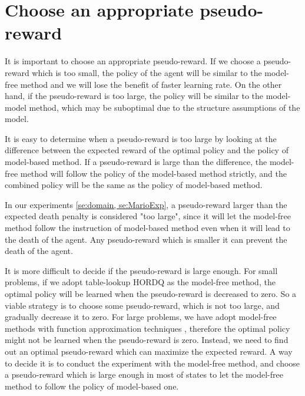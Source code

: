 


\section{Choose an appropriate pseudo-reward}
It is important to choose an appropriate pseudo-reward. If we choose a pseudo-reward which is too small, 
the policy of the agent will be similar to the model-free method and we will lose the 
benefit of faster learning rate. On the other hand, if the pseudo-reward is too large, 
the policy will be similar to the model-model method, which may be suboptimal due
to the structure assumptions of the model.

It is easy to determine when a pseudo-reward is too large by
looking at the difference between the expected reward of the optimal policy and the policy of model-based method.
If a pseudo-reward is large than the difference, the model-free method will follow the policy
of the model-based method strictly, and the combined policy will be the same as 
the policy of model-based method.

In our experiments \ref{se:domain, se:MarioExp}, a pseudo-reward larger than the expected death penalty is considered "too large", 
since it will let the model-free method follow the instruction of model-based method even 
when it will lead to the death of the agent. Any pseudo-reward which is smaller it can prevent the
death of the agent.

It is more difficult to decide if the pseudo-reward is large enough. 
For small problems, if we adopt table-lookup HORDQ as the model-free method,
the optimal policy will be learned when the pseudo-reward is decreased to zero.
So a viable strategy is to choose some pseudo-reward, which is not too large, and
gradually decrease it to zero.
For large problems, we have adopt model-free methods with function approximation techniques
, therefore the optimal policy might not be learned when the pseudo-reward is zero.
Instead, we need to find out an optimal pseudo-reward which can maximize the expected reward.
A way to decide it is to conduct the experiment with the model-free method,
and choose a pseudo-reward which is large enough in most of states to let
the model-free method to follow the policy of model-based one.

